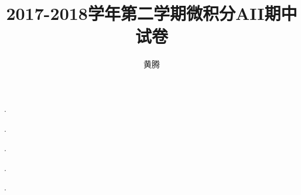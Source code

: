 \documentclass[answer]{USTBExam}
\title{2017-2018学年第二学期微积分AII期中试卷}
\author{黄腾}
\begin{document}
\makehead


\begin{problem}
  
  \pickout{}
  \options{}
    {}
    {}
    {}
\end{problem}

\begin{problem}
  
  \pickout{}
  \options{}
    {}
    {}
    {}
\end{problem}

\begin{problem}
  
  \pickout{}
  \options{}
    {}
    {}
    {}
\end{problem}

\begin{problem}
  
  \pickout{}
  \options{}
    {}
    {}
    {}
\end{problem}

\begin{problem}
  
  \pickout{}
  \options{}
    {}
    {}
    {}
\end{problem}

\begin{problem}
  
  \pickout{}
  \options{}
    {}
    {}
    {}
\end{problem}


\begin{problem}
  
  \fillin{}.
\end{problem}

\begin{problem}
  
  \fillin{}.
\end{problem}

\begin{problem}
  
  \fillin{}.
\end{problem}

\begin{problem}

  \fillin{}.
\end{problem}

\begin{problem}
  
  \fillin{}.
\end{problem}
\end{document}
